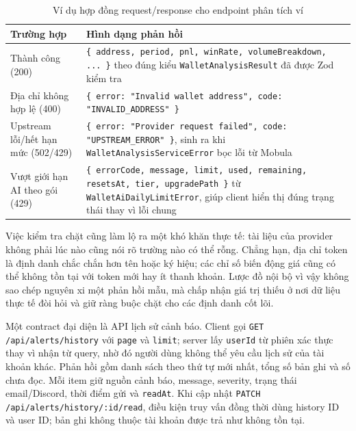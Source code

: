 \begin{table}[H]
\centering
\caption{Ví dụ hợp đồng request/response cho endpoint phân tích ví}
\label{tab:api_contract_example}
\small
\begin{tabularx}{\textwidth}{|p{2.6cm}|X|}
\hline
\textbf{Trường hợp} & \textbf{Hình dạng phản hồi} \\
\hline
Thành công (200) & \texttt{\{ address, period, pnl, winRate, volumeBreakdown, ... \}} theo đúng kiểu \texttt{WalletAnalysisResult} đã được Zod kiểm tra \\
\hline
Địa chỉ không hợp lệ (400) & \texttt{\{ error: "Invalid wallet address", code: "INVALID\_ADDRESS" \}} \\
\hline
Upstream lỗi/hết hạn mức (502/429) & \texttt{\{ error: "Provider request failed", code: "UPSTREAM\_ERROR" \}}, sinh ra khi \texttt{WalletAnalysisServiceError} bọc lỗi từ Mobula \\
\hline
Vượt giới hạn AI theo gói (429) & \texttt{\{ errorCode, message, limit, used, remaining, resetsAt, tier, upgradePath \}} từ \texttt{WalletAiDailyLimitError}, giúp client hiển thị đúng trạng thái thay vì lỗi chung \\
\hline
\end{tabularx}
\end{table}

Việc kiểm tra chặt cũng làm lộ ra một khó khăn thực tế: tài liệu của provider không phải lúc nào cũng nói rõ trường nào có thể rỗng. Chẳng hạn, địa chỉ token là định danh chắc chắn hơn tên hoặc ký hiệu; các chỉ số biến động giá cũng có thể không tồn tại với token mới hay ít thanh khoản. Lược đồ nội bộ vì vậy không sao chép nguyên xi một phản hồi mẫu, mà chấp nhận giá trị thiếu ở nơi dữ liệu thực tế đòi hỏi và giữ ràng buộc chặt cho các định danh cốt lõi.

Một contract đại diện là API lịch sử cảnh báo. Client gọi \texttt{GET /api/alerts/history} với \texttt{page} và \texttt{limit}; server lấy \texttt{userId} từ phiên xác thực thay vì nhận từ query, nhờ đó người dùng không thể yêu cầu lịch sử của tài khoản khác. Phản hồi gồm danh sách theo thứ tự mới nhất, tổng số bản ghi và số chưa đọc. Mỗi item giữ nguồn cảnh báo, message, severity, trạng thái email/Discord, thời điểm gửi và \texttt{readAt}. Khi cập nhật \texttt{PATCH /api/alerts/history/:id/read}, điều kiện truy vấn đồng thời dùng history ID và user ID; bản ghi không thuộc tài khoản được trả như không tồn tại.

